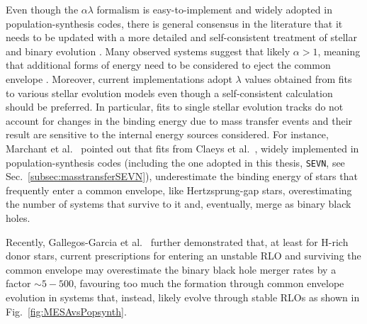 \documentclass[a4paper,titlepage]{book}     	%
\begin{document}
Even though the $\alpha \lambda$ formalism is easy-to-implement and widely adopted in population-synthesis codes, there is general consensus in the literature that it needs to be updated with a more detailed and self-consistent treatment of stellar and binary evolution \cite{marchant2021_masstransferMESA}. Many observed systems suggest that likely $\alpha > 1$, meaning that additional forms of energy need to be considered to eject the common envelope \cite{mapelli}. Moreover, current implementations adopt $\lambda$ values obtained from fits to various stellar evolution models even though  a self-consistent calculation should be preferred. In particular, fits to single stellar evolution tracks do not account for changes in the binding energy due to mass transfer events and their result are sensitive to the internal energy sources considered. For instance, Marchant et al.\ \cite{marchant2021_masstransferMESA} pointed out that fits from Claeys et al.\ \cite{Clayes2014_lambdaCE}, widely implemented in population-synthesis codes (including the one adopted in this thesis, \texttt{SEVN}, see Sec.\ \ref{subsec:masstransferSEVN}), underestimate the binding energy of stars that frequently enter a common envelope, like Hertzsprung-gap stars, overestimating the number of systems that survive to it and, eventually, merge as binary black holes. 


Recently, Gallegos-Garcia et al.\ \cite{gallegos2021MESAvspopsynth} further demonstrated that, at least for H-rich donor stars, current prescriptions for entering an unstable RLO and surviving the common envelope may overestimate  the binary black hole merger rates by a factor $\sim 5-500$, favouring too much the formation through common envelope evolution in systems that, instead, likely evolve through stable RLOs as shown in Fig.\ \ref{fig:MESAvsPopsynth}.
\end{document}
